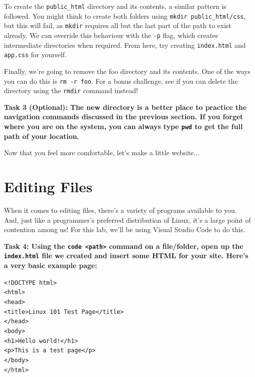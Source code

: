\documentclass[a4paper,11pt,parskip=half-]{scrartcl}
\begin{document}
To create the \texttt{public\_html} directory and its contents, a similar pattern is followed. 
You might think to create both folders using \texttt{mkdir public\_html/css}, but this will fail, as \texttt{mkdir} requires all but the last part of the path to exist already.
We can override this behaviour with the \texttt{-p} flag, which creates intermediate directories when required. 
From here, try creating \texttt{index.html} and \texttt{app.css} for yourself.

Finally, we’re going to remove the foo directory and its contents. 
One of the ways you can do this is \texttt{rm -r foo}. 
For a bonus challenge, see if you can delete the directory using the \texttt{rmdir} command instead!

\bfseries Task 3 (Optional): \normalfont 
The new directory is a better place to practice the navigation commands discussed in the previous section. 
If you forget where you are on the system, you can always type \texttt{pwd} to get the full path of your location. 

Now that you feel more comfortable, let's make a little website...

\newpage

\section*{Editing Files}

When it comes to editing files, there's a variety of programs available to you. 
And, just like a programmer's preferred distribution of Linux, it's a large point of contention among us! 
For this lab, we'll be using Visual Studio Code to do this.

\bfseries Task 4: \normalfont 
Using the \texttt{code <path>} command on a file/folder, open up the \texttt{index.html} file we created and insert some HTML for your site. 
Here's a very basic example page:

\qquad \texttt{<!DOCTYPE html>} \\
\qquad \texttt{<html>} \\
\qquad \qquad \texttt{<head>} \\
\qquad \qquad \qquad \texttt{<title>Linux 101 Test Page</title>} \\
\qquad \qquad \texttt{</head>} \\
\qquad \qquad \texttt{<body>} \\
\qquad \qquad \qquad \texttt{<h1>Hello world!</h1>} \\
\qquad \qquad \qquad \texttt{<p>This is a test page</p>} \\
\qquad \qquad \texttt{</body>} \\
\qquad \texttt{</html>}
\end{document}
